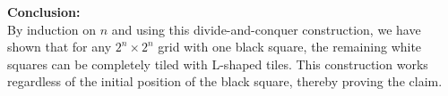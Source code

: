 \documentclass[11pt]{article}
\begin{document}
    \bigskip
    
    \textbf{Conclusion:} \\
    By induction on \( n \) and using this divide-and-conquer construction, we have shown that for any \( 2^n \times 2^n \) grid with one black square, the remaining white squares can be completely tiled with L-shaped tiles. This construction works regardless of the initial position of the black square, thereby proving the claim.
    
    
    
\end{document}
